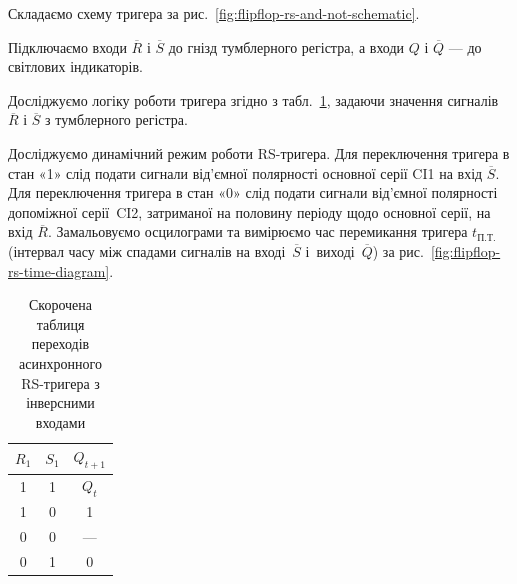 \documentclass[a4paper,oneside,DIV=10,12pt]{scrartcl}
\newcommand\barneg[1]{\overline{#1}}
\begin{document}
			\begin{steps}
				\item Складаємо схему тригера за рис.~\ref{fig:flipflop-rs-and-not-schematic}.
			
				\item Підключаємо входи $\barneg{R}$ і $\barneg{S}$ до гнізд тумблерного регістра, а входи $Q$ і $\barneg{Q}$ — до світлових індикаторів.
				
				\item Досліджуємо логіку роботи тригера згідно з табл.~\ref{tab:flipflop-rs-inv-excitation-table}, задаючи значення сигналів $\barneg{R}$ і $\barneg{S}$ з тумблерного регістра.
				
				\item Досліджуємо динамічний режим роботи RS-тригера. Для переключення тригера в стан «1» слід подати сигнали від'ємної полярності основної серії CI1 на вхід $\barneg{S}$. Для переключення тригера в стан «0» слід подати сигнали від'ємної полярності допоміжної серії~CI2, затриманої на половину періоду щодо основної серії, на вхід $\barneg{R}$. Замальовуємо осцилограми та вимірюємо час перемикання тригера $t_{\text{П.Т.}}$ (інтервал часу між спадами сигналів на вході~$\barneg{S}$ і~виході~$\barneg{Q}$) за рис.~\ref{fig:flipflop-rs-time-diagram}.
			\end{steps}
			
			\begin{table}[!htbp]
			\centering
				\begin{tabular}{ccc}
					\toprule
						$R_1$ & $S_1$ & $Q_{t+1}$\\
					\midrule
						1     & 1     & $Q_t$\\
						1     & 0     & 1\\
						0     & 0     & — \\
						0     & 1     & 0\\
					\bottomrule
				\end{tabular}
			\caption{Скорочена таблиця переходів асинхронного RS-тригера з інверсними входами}
			\label{tab:flipflop-rs-inv-excitation-table}
			\end{table}
		
\end{document}
